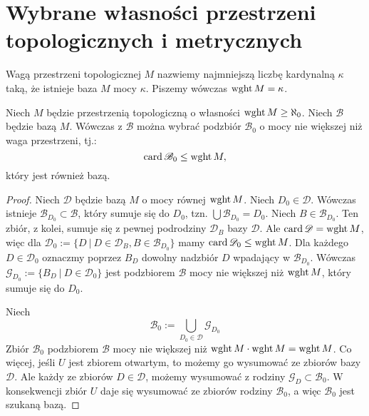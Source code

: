 \section{Wybrane własności przestrzeni topologicznych i metrycznych}
 
\begin{df}
  Wagą przestrzeni topologicznej $M$ nazwiemy najmniejszą liczbę kardynalną $\kappa$ taką, że istnieje baza $M$ mocy $\kappa$. Piszemy wówczas $\operatorname{wght} M = \kappa$.
\end{df}
 
\begin{lem} \label{lem:base-small}
  Niech $M$ będzie przestrzenią topologiczną o własności $\operatorname{wght} M \geq \aleph_0$. Niech $\mathcal B$ będzie bazą $M$. Wówczas z $\mathcal B$ można wybrać podzbiór $\mathcal B_0$ o mocy nie większej niż waga przestrzeni, tj.:
  \[
    \operatorname{card} \mathscr B_0 \leq \operatorname{wght} M,
  \]
  który jest również bazą.
  \begin{proof}
    Niech $\mathcal D$ będzie bazą $M$ o mocy równej $\operatorname{wght} M$. Niech $D_0 \in \mathcal D$. Wówczas istnieje $\mathcal B_{D_0} \subset \mathcal B$, który sumuje się do $D_0$, tzn. $\bigcup \mathcal B_{D_0} = D_0$. Niech $B \in \mathcal B_{D_0}$. Ten zbiór, z kolei, sumuje się z pewnej podrodziny $\mathcal D_B$ bazy $\mathcal D$. Ale $\operatorname{card}\mathscr D = \operatorname{wght} M$, więc dla $\mathcal D_0 := \{D\ |\ D \in \mathcal D_B, B \in \mathcal B_{D_0}\}$ mamy $\operatorname{card}\mathscr D_0 \leq \operatorname{wght} M$. Dla każdego $D \in \mathcal D_0$ oznaczmy poprzez $B_D$ dowolny nadzbiór $D$ wpadający w $\mathcal B_{D_0}$. Wówczas $\mathcal G_{D_0} := \{B_D\ |\ D \in \mathcal D_0\}$ jest podzbiorem $\mathcal B$ mocy nie większej niż $\operatorname{wght} M$, który sumuje się do $D_0$.
    
    Niech
    \[
      \mathcal B_0 := \bigcup_{D_0 \in \mathcal D} \mathcal G_{D_0}
    \]
    Zbiór $\mathcal B_0$ podzbiorem $\mathcal B$ mocy nie większej niż $\operatorname{wght} M \cdot \operatorname{wght} M = \operatorname{wght} M$. Co więcej, jeśli $U$ jest zbiorem otwartym, to możemy go wysumować ze zbiorów bazy $\mathcal D$. Ale każdy ze zbiorów $D \in \mathcal{D}$, możemy wysumować z rodziny $\mathcal G_D \subset \mathcal B_0$. W konsekwencji zbiór $U$ daje się wysumować ze zbiorów rodziny $\mathcal B_0$, a więc $\mathcal B_0$ jest szukaną bazą.
  \end{proof}
\end{lem}
 
